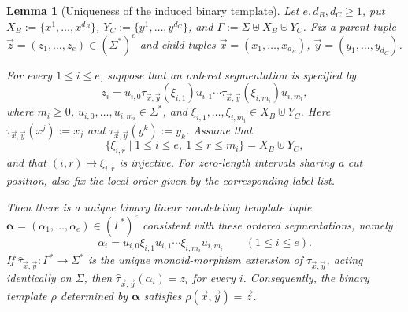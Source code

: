 \documentclass[11pt,a4paper]{article}
\newtheorem{lemma}[theorem]{Lemma}
\theoremstyle{remark}
\newcommand{\tuple}[1]{\vec{#1}}
\begin{document}
\begin{lemma}[Uniqueness of the induced binary template]
\label{lem:unique-induced-template}
Let \(e,d_B,d_C\ge1\), put
\(X_B:=\{x^1,\ldots,x^{d_B}\}\),
\(Y_C:=\{y^1,\ldots,y^{d_C}\}\), and
\(\Gamma:=\Sigma\uplus X_B\uplus Y_C\).  Fix a parent tuple
\(\tuple z=(z_1,\ldots,z_e)\in(\Sigma^*)^e\) and child tuples
\(\tuple x=(x_1,\ldots,x_{d_B})\),
\(\tuple y=(y_1,\ldots,y_{d_C})\).

For every \(1\le i\le e\), suppose that an ordered segmentation is specified by
\[
  z_i=u_{i,0}\tau_{\tuple x,\tuple y}(\xi_{i,1})u_{i,1}\cdots
      \tau_{\tuple x,\tuple y}(\xi_{i,m_i})u_{i,m_i},
  \tag{1}
\]
where \(m_i\ge0\), \(u_{i,0},\ldots,u_{i,m_i}\in\Sigma^*\), and
\(\xi_{i,1},\ldots,\xi_{i,m_i}\in X_B\uplus Y_C\).  Here
\(\tau_{\tuple x,\tuple y}(x^j):=x_j\) and
\(\tau_{\tuple x,\tuple y}(y^k):=y_k\).  Assume that
\[
  \{\xi_{i,r}\mid 1\le i\le e,\ 1\le r\le m_i\}=X_B\uplus Y_C,
  \tag{2}
\]
and that \((i,r)\mapsto\xi_{i,r}\) is injective.  For zero-length intervals
sharing a cut position, also fix the local order given by the corresponding
label list.

Then there is a unique binary linear nondeleting template tuple
\(\boldsymbol\alpha=(\alpha_1,\ldots,\alpha_e)\in(\Gamma^*)^e\) consistent
with these ordered segmentations, namely
\[
  \alpha_i=u_{i,0}\xi_{i,1}u_{i,1}\cdots
  \xi_{i,m_i}u_{i,m_i}\qquad(1\le i\le e).
  \tag{3}
\]
If \(\widehat\tau_{\tuple x,\tuple y}:\Gamma^*\to\Sigma^*\) is the unique
monoid-morphism extension of \(\tau_{\tuple x,\tuple y}\), acting identically
on \(\Sigma\), then
\(\widehat\tau_{\tuple x,\tuple y}(\alpha_i)=z_i\) for every \(i\).
Consequently, the binary template \(\rho\) determined by
\(\boldsymbol\alpha\) satisfies
\(\rho(\tuple x,\tuple y)=\tuple z\).
\end{lemma}
\end{document}
